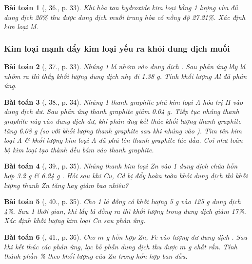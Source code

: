 \documentclass{article}
\newtheorem{baitoan}{Bài toán}
\begin{document}
\begin{baitoan}[\cite{An_350_BT_Hoa_Hoc_9}, 36., p. 33]
	Khi hòa tan hydroxide kim loại \emph{} bằng 1 lượng vừa đủ dung dịch \emph{ 20\%} thu được dung dịch muối trung hòa có nồng độ \emph{27.21\%}. Xác định kim loại M.
\end{baitoan}

\subsubsection{Kim loại mạnh đẩy kim loại yếu ra khỏi dung dịch muối}

\begin{baitoan}[\cite{An_350_BT_Hoa_Hoc_9}, 37., p. 33]
	Nhúng 1 lá nhôm vào dung dịch \emph{}. Sau phản ứng lấy lá nhôm ra thì thấy khối lượng dung dịch nhẹ đi \emph{1.38 g}. Tính khối lượng \emph{Al} đã phản ứng.
\end{baitoan}

\begin{baitoan}[\cite{An_350_BT_Hoa_Hoc_9}, 38., p. 34]
	Nhúng 1 thanh graphite phủ kim loại A hóa trị II vào dung dịch \emph{} dư. Sau phản ứng thanh graphite giảm \emph{0.04 g}. Tiếp tục nhúng thanh graphite này vào dung dịch \emph{} dư, khi phản ứng kết thúc khối lượng thanh graphite tăng \emph{6.08 g} (so với khối lượng thanh graphite sau khi nhúng vào \emph{}). Tìm tên kim loại A \& khối lượng kim loại A đã phủ lên thanh graphite lúc đầu. Coi như toàn bộ kim loại tạo thành đều bám vào thanh graphite.
\end{baitoan}

\begin{baitoan}[\cite{An_350_BT_Hoa_Hoc_9}, 39., p. 35]
	Nhúng thanh kim loại \emph{Zn} vào 1 dung dịch chứa hỗn hợp \emph{3.2 g } \& \emph{6.24 g }. Hỏi sau khi \emph{Cu, Cd} bị đẩy hoàn toàn khỏi dung dịch thì khối lượng thanh \emph{Zn} tăng hay giảm bao nhiêu?	
\end{baitoan}

\begin{baitoan}[\cite{An_350_BT_Hoa_Hoc_9}, 40., p. 35]
	Cho 1 lá đồng có khối lượng \emph{5 g} vào \emph{125 g} dung dịch \emph{ 4\%}. Sau 1 thời gian, khi lấy lá đồng ra thì khối lượng \emph{} trong dung dịch giảm \emph{17\%}. Xác định khối lượng kim loại \emph{Cu} sau phản ứng.
\end{baitoan}

\begin{baitoan}[\cite{An_350_BT_Hoa_Hoc_9}, 41., p. 36]
	Cho $m$ \emph{g} hỗn hợp \emph{Zn, Fe} vào lượng dư dung dịch \emph{}. Sau khi kết thúc các phản ứng, lọc bỏ phần dung dịch thu được $m$ \emph{g} chất rắn. Tính thành phần \% theo khối lượng của \emph{Zn} trong hỗn hợp ban đầu.
\end{baitoan}
\end{document}
